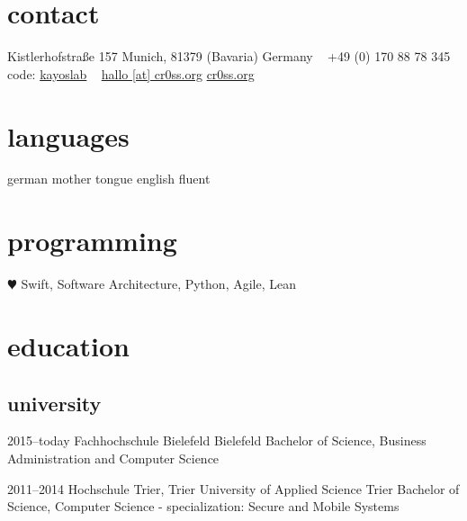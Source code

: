 \documentclass[]{friggeri-cv} %
\begin{document}


\begin{aside} %
	\section{contact}
	Kistlerhofstraße 157
	Munich, 81379 
	(Bavaria) Germany
	~
	+49 (0) 170 88 78 345
	code: \href{https://github.com/kayoslab}{kayoslab}
	~
	\href{mailto:hallo@cr0ss.org}{hallo [at] cr0ss.org}
	\href{https://cr0ss.org}{cr0ss.org}
	\section{languages}
	german mother tongue
	english fluent
	\section{programming}
	{\color{red} $\varheartsuit$} Swift,
	Software Architecture,
	Python, Agile, Lean
\end{aside}


\section{education}

\subsection{university}

\begin{entrylist}
	
	\entry
	{2015--today}
	{Fachhochschule Bielefeld}
	{Bielefeld}
	{Bachelor of Science, Business Administration and Computer Science}
	
	
	\entry
	{2011--2014}
	{Hochschule Trier, Trier University of Applied Science}
	{Trier}
	{Bachelor of Science, Computer Science - specialization: Secure and Mobile Systems}
	
	
\end{entrylist}
\end{document}
